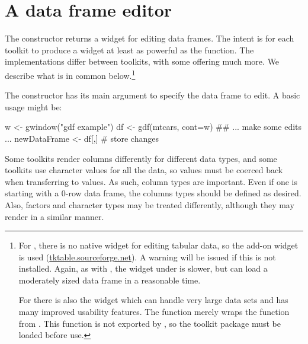 

\section{A data frame editor}
\label{sec:gWidgets-an-editor-tabular}

The  constructor returns a widget for editing data
frames. The intent is for each toolkit to produce a widget at least as
powerful as the  function. The implementations
differ between toolkits, with some offering much more. We describe
what is in common below.\footnote{ For , there is
  no native widget for editing tabular data, so the 
  add-on widget is used (\url{tktable.sourceforge.net}). A warning
  will be issued if this is not installed. Again, as with
  , the widget under  is slower,
  but can load a moderately sized data frame in a reasonable time. 
  
  For  there is also the 
  widget which can handle very large data sets and has many improved
  usability features. The  function merely wraps the
   function from . This function
  is not exported by , so the toolkit package must be
  loaded before use. }


The constructor has its main argument  to specify the data
frame to edit. A basic usage might be:

\begin{Schunk}
\begin{Sinput}
 w <- gwindow("gdf example")
 df <- gdf(mtcars, cont=w)
 ## ... make some edits ...
 newDataFrame <- df[,]                   # store changes
\end{Sinput}
\end{Schunk}
%

Some toolkits render columns differently for different data types, and
some toolkits use character values for all the data, so values must be
coerced back when transferring to \R\/ values. As such, column types
are important. Even if one is starting with a $0$-row data frame, the
columns types should be defined as desired. Also, factors and
character types may be treated differently, although they may render
in a similar manner.

